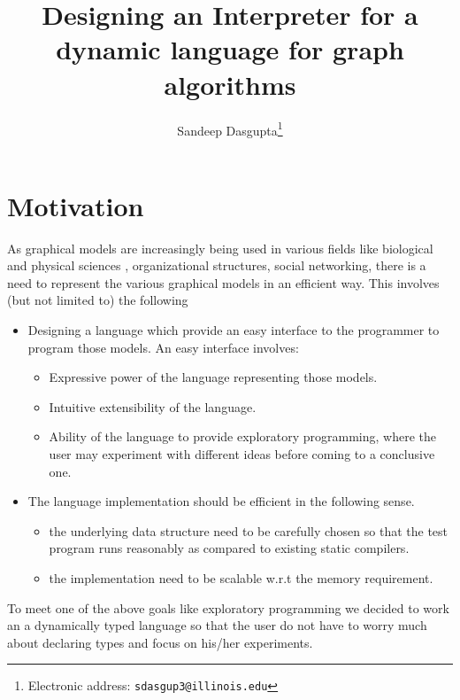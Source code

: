 \documentclass[12,twoside]{article}
\title{\textbf{Designing an Interpreter for a dynamic language for graph algorithms}}
\author{Sandeep Dasgupta\thanks{Electronic address:
\texttt{sdasgup3@illinois.edu}}}
\begin{document}
\begin{titlepage}
\thispagestyle{empty}
\maketitle
\pagebreak
\end{titlepage}


\section{Motivation}

As graphical models are increasingly being used in various
  fields like biological and physical sciences , organizational structures,
  social networking, there is a need to represent the various graphical models
    in an efficient way. This involves (but not limited to) the following
    \begin{itemize}
      \item Designing a language which provide an easy interface to the programmer to program those models.
        An easy interface involves:
        \begin{itemize}
          \item Expressive power of the language representing those models.
          \item Intuitive extensibility of the language.
          \item Ability of the language to provide exploratory programming, where the user
          may experiment with different ideas before coming to a conclusive one.
        \end{itemize}
     \item The language implementation should be efficient in the following sense.     
        \begin{itemize}
          \item the underlying data structure need to be carefully chosen 
            so that the test program runs reasonably as compared to existing 
            static compilers.
          \item the implementation need to be scalable w.r.t the memory requirement.
        \end{itemize}
   \end{itemize}       

   To meet one of the above goals like exploratory programming we decided 
     to work an a dynamically typed language so that the user do not 
     have to worry much about declaring types and focus on his/her 
     experiments.
\end{document}
